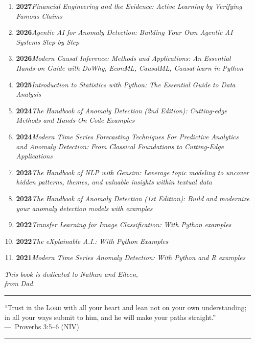 \begin{enumerate}[label=\arabic*., leftmargin=*, itemsep=0pt, topsep=4pt]
  \item \textbf{2027}\quad\textit{Financial Engineering and the Evidence: Active Learning by Verifying Famous Claims}
  \item \textbf{2026}\quad\textit{Agentic AI for Anomaly Detection: Building Your Own Agentic AI Systems Step by Step}
  \item \textbf{2026}\quad\textit{Modern Causal Inference: Methods and Applications: An Essential Hands-on Guide with DoWhy, EconML, CausalML, Causal-learn in Python}
  \item \textbf{2025}\quad\textit{Introduction to Statistics with Python: The Essential Guide to Data Analysis}
  \item \textbf{2024}\quad\textit{The Handbook of Anomaly Detection (2nd Edition): Cutting-edge Methods and Hands-On Code Examples}
  \item \textbf{2024}\quad\textit{Modern Time Series Forecasting Techniques For Predictive Analytics and Anomaly Detection: From Classical Foundations to Cutting-Edge Applications}
  \item \textbf{2023}\quad\textit{The Handbook of NLP with Gensim: Leverage topic modeling to uncover hidden patterns, themes, and valuable insights within textual data}
  \item \textbf{2023}\quad\textit{The Handbook of Anomaly Detection (1st Edition): Build and modernize your anomaly detection models with examples}
  \item \textbf{2022}\quad\textit{Transfer Learning for Image Classification: With Python examples}
  \item \textbf{2022}\quad\textit{The eXplainable A.I.: With Python Examples}
  \item \textbf{2021}\quad\textit{Modern Time Series Anomaly Detection: With Python and R examples}
\end{enumerate}

\thispagestyle{empty}
\vspace*{\fill}
\vspace{2cm}
\begin{center}
  \textit{This book is dedicated to Nathan and Eileen,}\\[4pt]
  \textit{from Dad.}
\end{center}

\vspace{2cm}

\noindent\rule{\textwidth}{0.8pt}
\begin{center}
  \begin{minipage}{0.85\textwidth}
    \centering
    ``Trust in the \textsc{Lord} with all your heart and lean not on your own
    understanding; in all your ways submit to him, and he will make your
    paths straight.''\\[6pt]
    ---~Proverbs 3:5--6 (NIV)
  \end{minipage}
\end{center}
\noindent\rule{\textwidth}{0.8pt}

\vspace*{\fill}